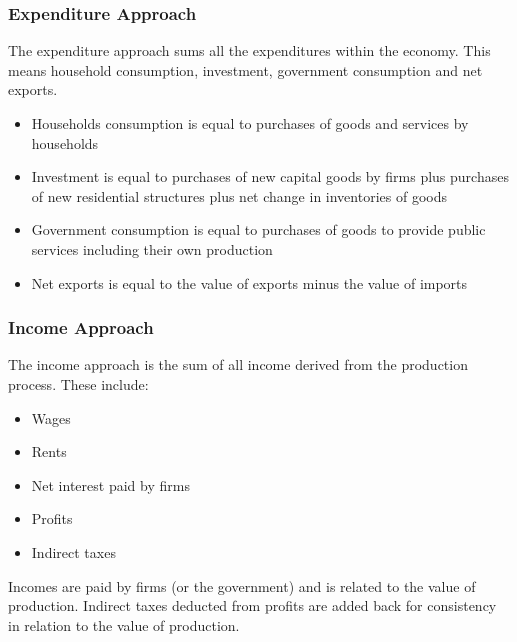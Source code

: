 \documentclass[12pt, letterpaper]{article}
\begin{document}
{\subsubsection{Expenditure Approach}
The expenditure approach sums all the expenditures within the economy. This means household consumption, investment, government consumption and net exports.
\begin{itemize}
	\item Households consumption is equal to purchases of goods and services by households
	\item Investment is equal to purchases of new capital goods by firms plus purchases of new residential structures plus net change in inventories of goods
	\item Government consumption is equal to purchases of goods to provide public services including their own production
	\item Net exports is equal to the value of exports minus the value of imports
\end{itemize}

\subsubsection{Income Approach}
The income approach is the sum of all income derived from the production process. These include:
\begin{itemize}
	\item Wages
	\item Rents
	\item Net interest paid by firms
	\item Profits
	\item Indirect taxes
\end{itemize}
Incomes are paid by firms (or the government) and is related to the value of production. Indirect taxes deducted from profits are added back for consistency in relation to the value of production.

}
\end{document}

